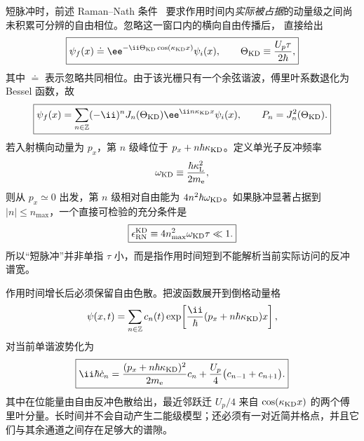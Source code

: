 \begin{exbox}
短脉冲时，前述 Raman--Nath 条件~ 要求作用时间内\emph{实际被占据}的动量级之间尚未积累可分辨的自由相位。忽略这一窗口内的横向自由传播后， 直接给出
\begin{equation}
\boxed{
\psi_f(x)\doteq
\ee^{-\ii\Theta_{\rm KD}\cos(\kappa_{\rm KD}x)}\psi_i(x),
\qquad
\Theta_{\rm KD}\equiv\frac{U_p\tau}{2\hbar},}
\label{eq:kd_raman_nath_phase}
\end{equation}
其中 $\doteq$ 表示忽略共同相位。由于该光栅只有一个余弦谐波，傅里叶系数退化为 Bessel 函数，故
\begin{equation}
\boxed{
\psi_f(x)=\sum_{n\in\mathbb Z}(-\ii)^nJ_n(\Theta_{\rm KD})
\ee^{\ii n\kappa_{\rm KD}x}\psi_i(x),
\qquad
P_n=J_n^2(\Theta_{\rm KD}).}
\label{eq:kd_raman_nath_bessel}
\end{equation}
若入射横向动量为 $p_x$，第 $n$ 级峰位于 $p_x+n\hbar\kappa_{\rm KD}$。定义单光子反冲频率
\[
\omega_{\rm KD}\equiv\frac{\hbar\kappa_{\rm L}^2}{2m_{\mathrm e}},
\]
则从 $p_x\simeq0$ 出发，第 $n$ 级相对自由能为 $4n^2\hbar\omega_{\rm KD}$。如果脉冲显著占据到 $|n|\le n_{\max}$，一个直接可检验的充分条件是
\begin{equation}
\boxed{\epsilon_{\rm RN}^{\rm KD}
\equiv4n_{\max}^2\omega_{\rm KD}\tau\ll1.}
\label{eq:kd_raman_nath_control}
\end{equation}
所以“短脉冲”并非单指 $\tau$ 小，而是指作用时间短到不能解析当前实际访问的反冲谱宽。

作用时间增长后必须保留自由色散。把波函数展开到倒格动量格
\[
\psi(x,t)=\sum_{n\in\mathbb Z}c_n(t)
\exp\!\left[\frac{\ii}{\hbar}(p_x+n\hbar\kappa_{\rm KD})x\right],
\]
 对当前单谐波势化为
\begin{equation}
\boxed{
\ii\hbar\dot c_n
=\frac{(p_x+n\hbar\kappa_{\rm KD})^2}{2m_{\mathrm e}}c_n
+\frac{U_p}{4}\bigl(c_{n-1}+c_{n+1}\bigr).}
\label{eq:kd_exact_momentum_chain}
\end{equation}
其中在位能量由自由反冲色散给出，最近邻跃迁 $U_p/4$ 来自 $\cos(\kappa_{\rm KD}x)$ 的两个傅里叶分量。长时间并不会自动产生二能级模型；还必须有一对近简并格点，并且它们与其余通道之间存在足够大的谱隙。


\end{exbox}
